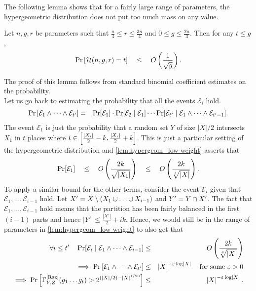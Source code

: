 The following lemma shows that for a fairly large range of parameters, the hypergeometric distribution does not put too much mass on any value.

\begin{lemma}\label{lem:hypergeom_low-weight}
  Let $n,g,r$ be parameters such that $\frac{n}{4} \leq r \leq \frac{3n}{4}$ and $0\leq g\leq \frac{2n}{3}$. 
Then for any $t\leq g$,
  $$
  \Pr\left[\mathcal{H}(n,g,r) = t\right] \quad \leq \quad O\left(\frac{1}{\sqrt{g}}\right).
  $$
\end{lemma}
The proof of this lemma follows from standard binomial coefficient estimates on the probability.\\

Let us go back to estimating the probability that all the events $\mathcal{E}_i$ hold.
\begin{eqnarray*}
  \Pr\left[\mathcal{E}_1 \wedge \dots \wedge \mathcal{E}_{t'}\right] & = & \Pr[\mathcal{E}_1] \cdot \Pr[\mathcal{E}_2 \mid \mathcal{E}_1] \cdots \Pr[\mathcal{E}_{t'}\mid \mathcal{E}_1 \wedge \dots \wedge \mathcal{E}_{t'-1}].
\end{eqnarray*}
The event $\mathcal{E}_1$ is just the probability that a random set $Y$ of size $|X|/2$ intersects $X_1$ in $t$ places where $t \in \left[\frac{|X_i|}{2} -k , \frac{|X_i|}{2} +k\right]$. 
This is just a particular setting of the hypergeometric distribution and \autoref{lem:hypergeom_low-weight} asserts that
$$
\Pr[\mathcal{E}_1] \quad \leq \quad O\left(\frac{2k}{\sqrt{|X_1|}}\right) \quad \leq \quad O\left(\frac{2k}{\sqrt[4]{|X|}}\right).
$$
To apply a similar bound for the other terms, consider the event $\mathcal{E}_i$ given that $\mathcal{E}_1, \dots, \mathcal{E}_{i-1}$ hold. 
Let $X' = X \setminus (X_1 \union \dots \union X_{i-1})$ and $Y' = Y\cap X'$. 
The fact that $\mathcal{E}_1,\dots, \mathcal{E}_{i-1}$ hold means that the partition has been fairly balanced in the first $(i-1)$ parts and hence $|Y'| \leq \frac{|X'|}{2} + ik$. 
Hence, we would still be in the range of parameters in \autoref{lem:hypergeom_low-weight} to also get that
\begin{eqnarray*}
  \forall i\leq t'\quad \Pr[\mathcal{E}_i\mid \mathcal{E}_1 \wedge \cdots \wedge \mathcal{E}_{i-1}] &\leq& O\left(\frac{2k}{\sqrt[4]{|X|}}\right)\\
  \implies \Pr\left[\mathcal{E}_1\wedge \dots \wedge \mathcal{E}_{t'}\right] & \leq & \left|X\right|^{-\varepsilon \log \left|X\right|} \quad\text{for some $\varepsilon > 0$}  \\
  \implies \Pr\left[\Gamma^{\mathrm{[Raz]}}_{Y,Z}(g_1\dots g_t) > 2^{(|X|/2) - |X|^{1/20}}\right] & \leq & \left|X\right|^{-\varepsilon \log \left|X\right|}.
\end{eqnarray*}

